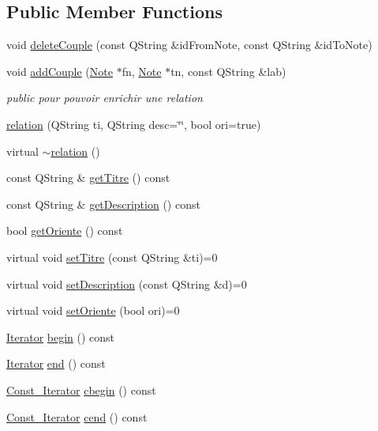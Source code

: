 \subsection*{Public Member Functions}
\begin{DoxyCompactItemize}
\item 
void \hyperlink{classrelation_aa7b9374ea48b4631c8cafd45d4cb192d}{delete\+Couple} (const Q\+String \&id\+From\+Note, const Q\+String \&id\+To\+Note)
\item 
void \hyperlink{classrelation_a5dd8bf4abb464c900a8e26894a044afb}{add\+Couple} (\hyperlink{classNote}{Note} $\ast$fn, \hyperlink{classNote}{Note} $\ast$tn, const Q\+String \&lab)
\begin{DoxyCompactList}\small\item\em public pour pouvoir enrichir une relation \end{DoxyCompactList}\item 
\hyperlink{classrelation_acedb0771ade551dbb48f573821c9d922}{relation} (Q\+String ti, Q\+String desc=\char`\"{}\char`\"{}, bool ori=true)
\item 
virtual \hyperlink{classrelation_a66b87b81c206f2b28bd3010158ebb96b}{$\sim$relation} ()
\item 
const Q\+String \& \hyperlink{classrelation_a0c0a8324ee5d209ded62d42af7972ec5}{get\+Titre} () const 
\item 
const Q\+String \& \hyperlink{classrelation_a7e3d22034aa9c3e6a605a29ccc3fa528}{get\+Description} () const 
\item 
bool \hyperlink{classrelation_a3c83c98b0eae28344dd6d0a7df6a2fb3}{get\+Oriente} () const 
\item 
virtual void \hyperlink{classrelation_acc17f66306544fa52006af4b5303b629}{set\+Titre} (const Q\+String \&ti)=0
\item 
virtual void \hyperlink{classrelation_a1770dcc13cd80586d69be8c52dba4da7}{set\+Description} (const Q\+String \&d)=0
\item 
virtual void \hyperlink{classrelation_ac8dda23c3ba2b25eef2aebb16b14c312}{set\+Oriente} (bool ori)=0
\item 
\hyperlink{classrelation_1_1Iterator}{Iterator} \hyperlink{classrelation_ad43d1bf857a56db0a45c286bc5386865}{begin} () const 
\item 
\hyperlink{classrelation_1_1Iterator}{Iterator} \hyperlink{classrelation_a490c4710e434658d749df5d766301621}{end} () const 
\item 
\hyperlink{classrelation_1_1Const__Iterator}{Const\+\_\+\+Iterator} \hyperlink{classrelation_ae1fb94a1b37edd1c003db2563c5baf81}{cbegin} () const 
\item 
\hyperlink{classrelation_1_1Const__Iterator}{Const\+\_\+\+Iterator} \hyperlink{classrelation_aff46d1fa1acbf96a8874eaeb7d119e12}{cend} () const 
\end{DoxyCompactItemize}
